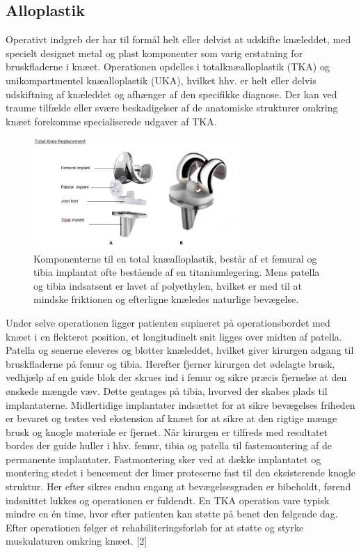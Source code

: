 \subsection{Alloplastik}
Operativt indgreb der har til formål helt eller delvist at udskifte knæleddet, med specielt designet metal og plast komponenter som varig erstatning for bruskfladerne i knæet. Operationen opdelles i totalknæalloplastik (TKA) og unikompartmentel knæalloplastik (UKA), hvilket hhv. er helt eller delvis udskiftning af knæleddet og afhænger af den specifikke diagnose. Der kan ved traume tilfælde eller svære beskadigelser af de anatomiske strukturer omkring knæet forekomme specialiserede udgaver af TKA.

\begin{figure}[H] 
\begin{center}
\includegraphics[width=0.7\textwidth]{figures/tka_implant}
\end{center}
\caption{Komponenterne til en total knæalloplastik, består af et femural og tibia implantat ofte bestående af en titaniumlegering. Mens patella og tibia indsatsent er lavet af polyethylen, hvilket er med til at mindske friktionen og efterligne knæledes naturlige bevægelse.\cite{1}} 
\label{fig:tka_implant} 
\end{figure}

Under selve operationen ligger patienten supineret på operationsbordet med knæet i en flekteret position, et longitudinelt snit ligges over midten af patella. Patella og senerne eleveres og blotter knæleddet, hvilket giver kirurgen adgang til bruskfladerne på femur og tibia. Herefter fjerner kirurgen det ødelagte brusk, vedhjælp af en guide blok der skrues ind i femur og sikre præcis fjernelse at den ønskede mængde væv. Dette gentages på tibia, hvorved der skabes plads til implantaterne. Midlertidige implantater indsættet for at sikre bevægelses friheden er bevaret og testes ved ekstension af knæet for at sikre at den rigtige mænge brusk og knogle materiale er fjernet. Når kirurgen er tilfreds med resultatet bordes der guide huller i hhv. femur, tibia og patella til fastemontering af de permanente implantater. Fastmontering sker ved at dække implantatet og montering stedet i bencement der limer proteserne fast til den eksisterende knogle struktur. Her efter sikres endnu engang at bevægelsesgraden er bibeholdt, førend indsnittet lukkes og operationen er fuldendt. En TKA operation vare typisk mindre en én time, hvor efter patienten kan støtte på benet den følgende dag. Efter operationen følger et rehabiliteringsforløb for at støtte og styrke muskulaturen omkring knæet. [2]

